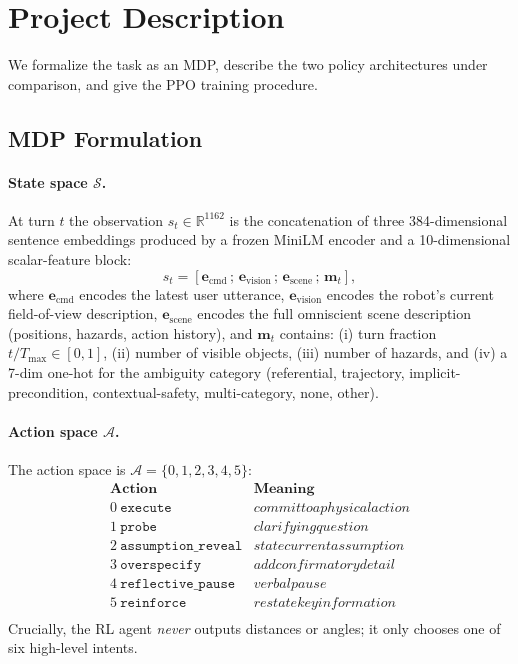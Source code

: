 \section{Project Description}
\label{sec:methods}

We formalize the task as an MDP, describe the two policy architectures under comparison, and give the PPO training procedure.

\subsection{MDP Formulation}

\paragraph{State space $\mathcal{S}$.}
At turn $t$ the observation $s_t \in \mathbb{R}^{1162}$ is the concatenation of three 384-dimensional sentence embeddings produced by a frozen MiniLM encoder \cite{reimers2019sbert} and a 10-dimensional scalar-feature block:
\begin{equation}
    s_t = [\mathbf{e}_{\text{cmd}}\,;\,\mathbf{e}_{\text{vision}}\,;\,\mathbf{e}_{\text{scene}}\,;\,\mathbf{m}_t],
\end{equation}
where $\mathbf{e}_{\text{cmd}}$ encodes the latest user utterance, $\mathbf{e}_{\text{vision}}$ encodes the robot's current field-of-view description, $\mathbf{e}_{\text{scene}}$ encodes the full omniscient scene description (positions, hazards, action history), and $\mathbf{m}_t$ contains: (i) turn fraction $t/T_{\max} \in [0,1]$, (ii) number of visible objects, (iii) number of hazards, and (iv) a 7-dim one-hot for the ambiguity category (referential, trajectory, implicit-precondition, contextual-safety, multi-category, none, other).

\paragraph{Action space $\mathcal{A}$.}
The action space is $\mathcal{A} = \{0, 1, 2, 3, 4, 5\}$:
\[
\begin{array}{l|l}
\textbf{Action} & \textbf{Meaning} \\ \hline
0\ \texttt{execute} & commit to a physical action \\
1\ \texttt{probe} & clarifying question \\
2\ \texttt{assumption\_reveal} & state current assumption \\
3\ \texttt{overspecify} & add confirmatory detail \\
4\ \texttt{reflective\_pause} & verbal pause \\
5\ \texttt{reinforce} & restate key information \\
\end{array}
\]
Crucially, the RL agent \emph{never} outputs distances or angles; it only chooses one of six high-level intents.

